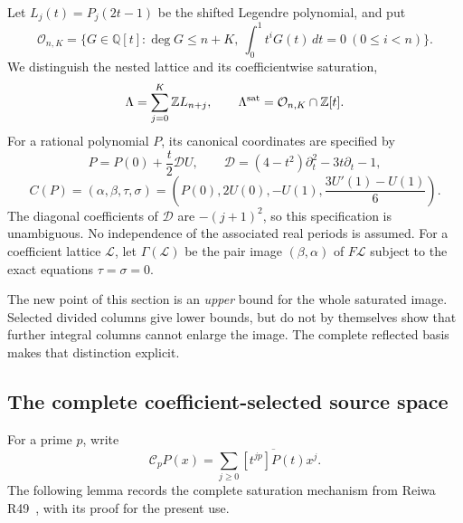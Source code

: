 \documentclass[11pt,a4paper]{article}
\numberwithin{equation}{section}
\theoremstyle{definition}\newtheorem{definition}[theorem]{Definition}
\theoremstyle{remark}\newtheorem{remark}[theorem]{Remark}
\begin{document}
Let $L_j(t)=P_j(2t-1)$ be the shifted Legendre polynomial, and put
\[
 \mathcal O_{n,K}=\{G\in\mathbb Q[t]:\deg G\le n+K,
       \ \int_0^1t^iG(t)\,dt=0\ (0\le i<n)\}.
\]
We distinguish the nested lattice and its coefficientwise saturation,
\[
 \Lambda=\sum_{j=0}^K\mathbb ZL_{n+j},\qquad
 \Lambda^{\rm sat}=\mathcal O_{n,K}\cap\mathbb Z[t].
\]
For a rational polynomial $P$, its canonical coordinates are specified by
\[
 P=P(0)+\frac t2\mathcal DU,\qquad
 \mathcal D=(4-t^2)\partial_t^2-3t\partial_t-1,
\]
\[
 C(P)=(\alpha,\beta,\tau,\sigma)
 =\left(P(0),2U(0),-U(1),\frac{3U'(1)-U(1)}6\right).
\]
The diagonal coefficients of $\mathcal D$ are $-(j+1)^2$, so this
specification is unambiguous. No independence of the associated real
periods is assumed. For a coefficient lattice $\mathcal L$, let
$\Gamma(\mathcal L)$ be the pair image $(\beta,\alpha)$ of $F\mathcal L$
subject to the exact equations $\tau=\sigma=0$.

The new point of this section is an \emph{upper} bound for the whole
saturated image. Selected divided columns give lower bounds, but do not
by themselves show that further integral columns cannot enlarge the
image. The complete reflected basis makes that distinction explicit.

\subsection{The complete coefficient-selected source space}
For a prime $p$, write
\[
 \mathcal C_pP(x)=\sum_{j\ge0}\overline{[t^{jp}]P(t)}x^j.
\]
The following lemma records the complete saturation mechanism from
Reiwa R49~\cite{R49}, with its proof for the present use.
\end{document}
